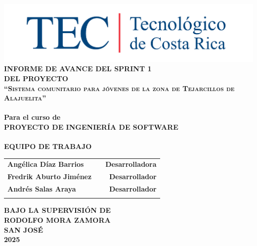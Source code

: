\newpage
\begin{center}
\thispagestyle{empty}
\includegraphics[scale=1]{project/images/Firma-TEC.png}\\
\vspace{1cm}
\Large{\textbf{INFORME DE AVANCE DEL SPRINT 1\\ \large{DEL PROYECTO}}}\\[1cm]
\LARGE{\textsc {\textbf{``Sistema comunitario para jóvenes de la zona de
 Tejarcillos de Alajuelita''}}}\\[3cm]
\Large{\textbf{\\Para el curso de}}
\LARGE{\textbf{\\PROYECTO DE INGENIERÍA DE SOFTWARE\\}}
\vspace{0.5cm}
\vspace{1cm}
\Large{\textbf{\\EQUIPO DE TRABAJO}}\\[0.3cm]
\begin{table}[h]
\centering
\large{
\begin{tabular}{>{\bfseries}lc>{\bfseries}r}
Angélica Díaz Barrios & & Desarrolladora\\ %
Fredrik Aburto Jiménez & & Desarrollador\\
Andrés Salas Araya & & Desarrollador\\

 & & \\
\end{tabular}}
\end{table}
\vspace{0.5cm}
\large{\textbf{BAJO LA SUPERVISIÓN DE}}\\
\large{\textbf{RODOLFO MORA ZAMORA}}\\
\vspace{1cm}
\large{\textbf{SAN JOSÉ}}
\large{\textbf{\\2025}}\\
\vspace{1cm}
\newpage
\end{center}